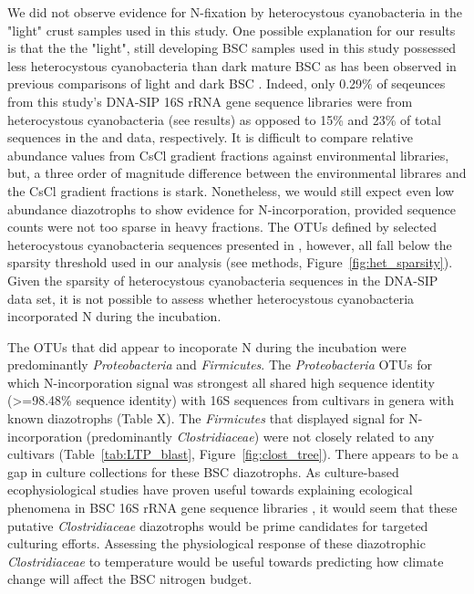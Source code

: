 We did not observe evidence for N-fixation by heterocystous cyanobacteria in the "light" crust samples used in this study. One possible explanation for our results is that the the "light", still developing BSC samples used in this study possessed less heterocystous cyanobacteria than dark mature BSC as has been observed in previous comparisons of light and dark BSC \cite{14766579}. Indeed, only 0.29\% of seqeunces from this study's DNA-SIP 16S rRNA gene sequence libraries were from heterocystous cyanobacteria (see results) as opposed to 15\% and 23\% of total sequences in the \citet{Steven_2013} and \citet{Garcia_Pichel_2013} data, respectively. It is difficult to compare relative abundance values from CsCl gradient fractions against environmental libraries, but, a three order of magnitude difference between the environmental librares and the CsCl gradient fractions is stark. Nonetheless, we would still expect even low abundance diazotrophs to show evidence for N-incorporation, provided sequence counts were not too sparse in heavy fractions. The OTUs defined by selected heterocystous cyanobacteria sequences presented in \citet{Yeager}, however, all fall below the sparsity threshold used in our analysis (see methods, Figure~\ref{fig:het_sparsity}). Given the sparsity of heterocystous cyanobacteria sequences in the DNA-SIP data set, it is not possible to assess whether heterocystous cyanobacteria incorporated N during the incubation.

The OTUs that did appear to incoporate N during the incubation were predominantly \textit{Proteobacteria} and \textit{Firmicutes}. The \textit{Proteobacteria} OTUs for which N-incorporation signal was strongest all shared high sequence identity (\textgreater=98.48\% sequence identity) with 16S sequences from cultivars in genera with known diazotrophs (Table X). The \textit{Firmicutes} that displayed signal for N-incorporation (predominantly \textit{Clostridiaceae}) were not closely related to any cultivars (Table~\ref{tab:LTP_blast}, Figure~\ref{fig:clost_tree}). There appears to be a gap in culture collections for these BSC diazotrophs. As culture-based ecophysiological studies have proven useful towards explaining ecological phenomena in BSC 16S rRNA gene sequence libraries \cite{Garcia_Pichel_2013}, it would seem that these putative \textit{Clostridiaceae} diazotrophs would be prime candidates for targeted culturing efforts. Assessing the physiological response of these diazotrophic \textit{Clostridiaceae} to temperature would be useful towards predicting how climate change will affect the BSC nitrogen budget. 

